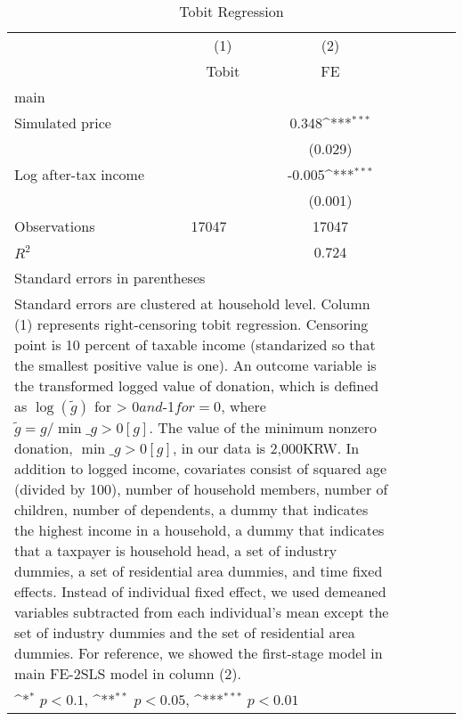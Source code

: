 \begin{table}[htbp]\centering
\def\sym#1{\ifmmode^{#1}\else\(^{#1}\)\fi}
\caption{Tobit Regression}
\begin{tabular}{l*{2}{lcc}}
\toprule
                    &\multicolumn{1}{c}{(1)}&\multicolumn{1}{c}{(2)}\\
                    &\multicolumn{1}{c}{Tobit}&\multicolumn{1}{c}{FE}\\
\midrule
main                &                     &                     \\
Simulated price     &                     &       0.348\sym{***}\\
                    &                     &     (0.029)         \\
\addlinespace
Log after-tax income&                     &      -0.005\sym{***}\\
                    &                     &     (0.001)         \\
\midrule
Observations        &       17047         &       17047         \\
\(R^{2}\)           &                     &       0.724         \\
\bottomrule
\multicolumn{3}{l}{\footnotesize Standard errors in parentheses}\\
\multicolumn{3}{l}{\footnotesize Standard errors are clustered at household level. Column (1) represents right-censoring tobit regression. Censoring point is 10 percent of taxable income (standarized so that the smallest positive value is one). An outcome variable is the transformed logged value of donation, which is defined as $\log(\tilde{g})$ for  > 0$ and $-1$ for =0$, where $\tilde{g}=g/\min\_{g>0}[g]$. The value of the minimum nonzero donation, $\min\_{g>0}[g]$, in our data is 2,000KRW. In addition to logged income, covariates consist of squared age (divided by 100), number of household members, number of children, number of dependents, a dummy that indicates the highest income in a household, a dummy that indicates that a taxpayer is household head, a set of industry dummies, a set of residential area dummies, and time fixed effects. Instead of individual fixed effect, we used demeaned variables subtracted from each individual's mean except the set of industry dummies and the set of residential area dummies. For reference, we showed the first-stage model in main FE-2SLS model in column (2).}\\
\multicolumn{3}{l}{\footnotesize \sym{*} \(p<0.1\), \sym{**} \(p<0.05\), \sym{***} \(p<0.01\)}\\
\end{tabular}
\end{table}
